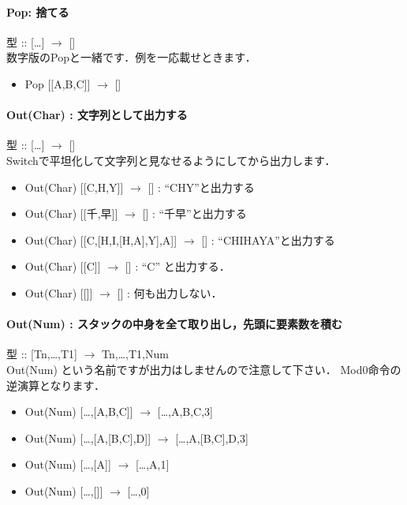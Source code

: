 \paragraph{Pop: 捨てる}

型 :: {[}\ldots{}{]} $\to$
{[}{]}\\数字版のPopと一緒です．例を一応載せときます．

\begin{itemize}
\item
  Pop {[}{[}A,B,C{]}{]} $\to$ {[}{]}
\end{itemize}

\paragraph{Out(Char) : 文字列として出力する}

型 :: {[}\ldots{}{]} $\to$ {[}{]}\\
Switchで平坦化して文字列と見なせるようにしてから出力します．

\begin{itemize}
\item
  Out(Char) {[}{[}C,H,Y{]}{]} $\to$ {[}{]} : ``CHY''と出力する
\item
  Out(Char) {[}{[}千,早{]}{]} $\to$ {[}{]} :
  ``千早''と出力する
\item
  Out(Char) {[}{[}C,{[}H,I,{[}H,A{]},Y{]},A{]}{]} $\to$ {[}{]}
  : ``CHIHAYA''と出力する
\item
  Out(Char) {[}{[}C{]}{]} $\to$ {[}{]} : ``C'' と出力する．
\item
  Out(Char) {[}{[}{]}{]} $\to$ {[}{]} : 何も出力しない．
\end{itemize}

\paragraph{Out(Num) : スタックの中身を全て取り出し，先頭に要素数を積む}

型 :: {[}Tn,\ldots{},T1{]} $\to$ Tn,\ldots{},T1,Num\\Out(Num)
という名前ですが出力はしませんので注意して下さい．
Mod0命令の逆演算となります．

\begin{itemize}
\item
  Out(Num) {[}\ldots{},{[}A,B,C{]}{]} $\to$
  {[}\ldots{},A,B,C,3{]}
\item
  Out(Num) {[}\ldots{},{[}A,{[}B,C{]},D{]}{]} $\to$
  {[}\ldots{},A,{[}B,C{]},D,3{]}
\item
  Out(Num) {[}\ldots{},{[}A{]}{]} $\to$ {[}\ldots{},A,1{]}
\item
  Out(Num) {[}\ldots{},{[}{]}{]} $\to$ {[}\ldots{},0{]}
\end{itemize}

